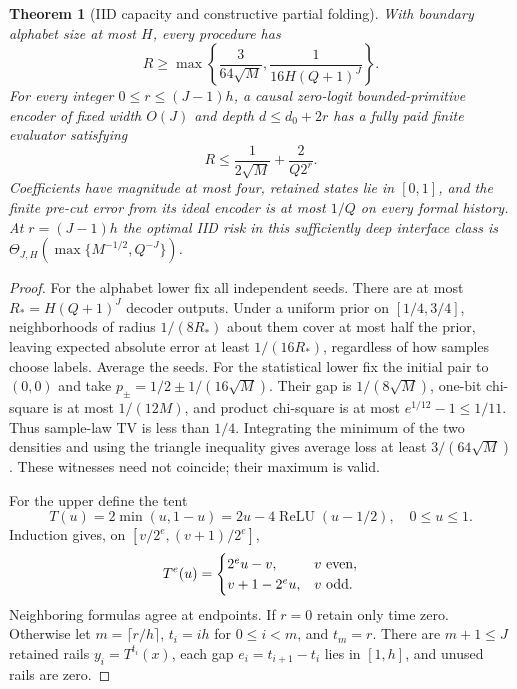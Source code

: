 \documentclass[11pt,letterpaper]{article}
\newtheorem{theorem}{Theorem}[section]
\theoremstyle{definition}\newtheorem{definition}[theorem]{Definition}
\theoremstyle{remark}\newtheorem{remark}[theorem]{Remark}
\begin{document}
\begin{theorem}[IID capacity and constructive partial folding]\label{thm:iidcapacity}
With boundary alphabet size at most $H$, every procedure has
\[
 R\ge\max\left\{\frac3{64\sqrt M},\frac1{16H(Q+1)^J}\right\}.
\]
For every integer $0\le r\le(J-1)h$, a causal zero-logit bounded-primitive encoder of fixed width $O(J)$ and depth $d\le d_0+2r$ has a fully paid finite evaluator satisfying
\[
 R\le\frac1{2\sqrt M}+\frac2{Q2^r}.
\]
Coefficients have magnitude at most four, retained states lie in $[0,1]$, and the finite pre-cut error from its ideal encoder is at most $1/Q$ on every formal history. At $r=(J-1)h$ the optimal IID risk in this sufficiently deep interface class is
$\Theta_{J,H}(\max\{M^{-1/2},Q^{-J}\})$.
\end{theorem}
\begin{proof}
For the alphabet lower fix all independent seeds. There are at most $R_*=H(Q+1)^J$ decoder outputs. Under a uniform prior on $[1/4,3/4]$, neighborhoods of radius $1/(8R_*)$ about them cover at most half the prior, leaving expected absolute error at least $1/(16R_*)$, regardless of how samples choose labels. Average the seeds. For the statistical lower fix the initial pair to $(0,0)$ and take $p_\pm=1/2\pm1/(16\sqrt M)$. Their gap is $1/(8\sqrt M)$, one-bit chi-square is at most $1/(12M)$, and product chi-square is at most $e^{1/12}-1\le1/11$. Thus sample-law TV is less than $1/4$. Integrating the minimum of the two densities and using the triangle inequality gives average loss at least $3/(64\sqrt M)$. These witnesses need not coincide; their maximum is valid.

For the upper define the tent
\[
 T(u)=2\min(u,1-u)=2u-4\operatorname{ReLU}(u-1/2),\quad 0\le u\le1.
\]
Induction gives, on $[v/2^e,(v+1)/2^e]$,
\[
 T^e(u)=\begin{cases}2^eu-v,&v\hbox{ even},\\v+1-2^eu,&v\hbox{ odd}.\end{cases}
\]
Neighboring formulas agree at endpoints. If $r=0$ retain only time zero. Otherwise let $m=\lceil r/h\rceil$, $t_i=ih$ for $0\le i<m$, and $t_m=r$. There are $m+1\le J$ retained rails $y_i=T^{t_i}(x)$, each gap $e_i=t_{i+1}-t_i$ lies in $[1,h]$, and unused rails are zero.


\end{proof}
\end{document}
